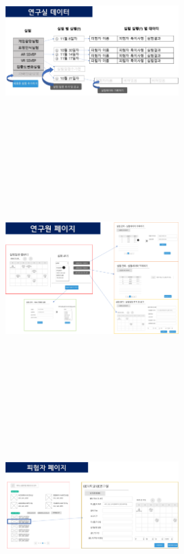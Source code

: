 \documentclass[letterpaper, 10 pt, conference]{ieeeconf}  %
\begin{document}
\subsubsection{\\}

\includegraphics[width=0.5\textwidth,height = 7cm]{Oven/14_structureOfExperimentData.png}

\subsubsection{\\}

\includegraphics[width=0.5\textwidth,height = 7cm]{Oven/15_linkOfLabPages.png}

\subsubsection{\\}

\includegraphics[width=0.5\textwidth,height = 7cm]{Oven/16_linkOfApplicantPages.png}
\end{document}
